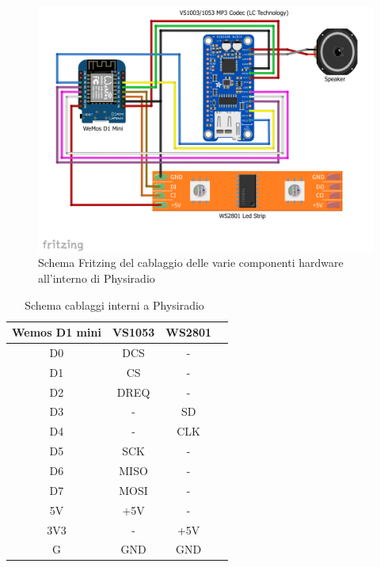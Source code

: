 \documentclass[12pt,a4paper]{report}
\newcommand{\physiradio}{Physiradio} %
\begin{document}
\begin{center}
	\begin{figure}[H]
		\begin{center}
			\centerline{\includegraphics[scale=0.6]{Immagini/SchemaWiringsFritzing.png}}
			\caption{Schema Fritzing del cablaggio delle varie componenti hardware all'interno di Physiradio}
			\label{fig:schemaFritzing}
		\end{center}
	\end{figure}
	
	\begin{table}
		\centering
		\begin{tabular}{|c|c|c|c|}
			\hline
			\textbf{Wemos D1 mini} & \textbf{VS1053} & \textbf{WS2801} \\
			\hline
			D0 & DCS & - \\  
			\hline
			D1 & CS & - \\
			\hline
			D2 & DREQ & - \\
			\hline
			D3 & - & SD \\
			\hline
			D4 & - & CLK  \\
			\hline
			D5 & SCK & -  \\
			\hline
			D6 & MISO & -  \\
			\hline
			D7 & MOSI & -  \\
			\hline
			5V & +5V & -  \\
			\hline
			3V3 & - & +5V  \\
			\hline
			G & GND & GND  \\
			\hline	
		\end{tabular}
		\caption{Schema cablaggi interni a \physiradio\ }
		\label{tab:wirings}	
	\end{table}
\end{center}
\end{document}
